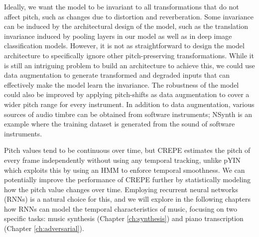 Ideally, we want the model to be invariant to all transformations that do not affect pitch, such as changes due to distortion and reverberation.
Some invariance can be induced by the architectural design of the model, such as the translation invariance induced by pooling layers in our model as well as in deep image classification models.
However, it is not as straightforward to design the model architecture to specifically ignore other pitch-preserving transformations.
While it is still an intriguing problem to build an architecture to achieve this, we could use data augmentation to generate transformed and degraded inputs that can effectively make the model learn the invariance.
The robustness of the model could also be improved by applying pitch-shifts as data augmentation \cite{mcfee2015muda} to cover a wider pitch range for every instrument.
In addition to data augmentation, various sources of audio timbre can be obtained from software instruments; NSynth \cite{engel2017nsynth} is an example where the training dataset is generated from the sound of software instruments.


Pitch values tend to be continuous over time, but CREPE estimates the pitch of every frame independently without using any temporal tracking, unlike pYIN which exploits this by using an HMM to enforce temporal smoothness.
We can potentially improve the performance of CREPE further by statistically modeling how the pitch value changes over time.
Employing recurrent neural networks (RNNs) is a natural choice for this, and we will explore in the following chapters how RNNs can model the temporal characteristics of music, focusing on two specific tasks: music synthesis (Chapter \ref{ch:synthesis}) and piano transcription (Chapter \ref{ch:adversarial}).


